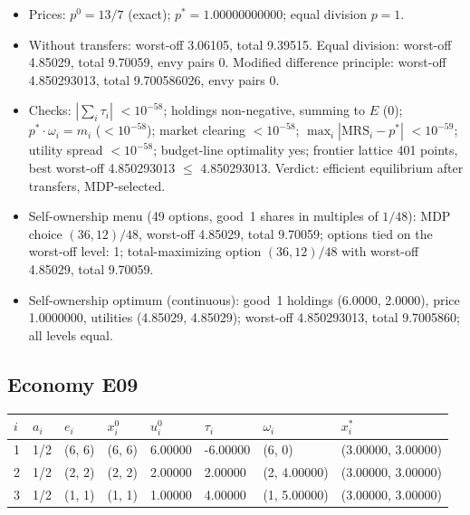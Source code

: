 \begin{itemize}[leftmargin=1.2em,itemsep=0pt,topsep=2pt]\footnotesize
\item Prices: $p^0 = 13/7$ (exact); $p^* = 1.00000000000$; equal division $p = 1$.
\item Without transfers: worst-off 3.06105, total 9.39515. Equal division: worst-off 4.85029, total 9.70059, envy pairs 0. Modified difference principle: worst-off 4.850293013, total 9.700586026, envy pairs 0.
\item Checks: $|\sum_i\tau_i|$ $<10^{-58}$; holdings non-negative, summing to $E$ (0); $p^*\cdot\omega_i = m_i$ ($<10^{-58}$); market clearing $<10^{-58}$; $\max_i|\mathrm{MRS}_i - p^*|$ $<10^{-59}$; utility spread $<10^{-58}$; budget-line optimality yes; frontier lattice 401 points, best worst-off 4.850293013 $\leq$ 4.850293013. Verdict: efficient equilibrium after transfers, MDP-selected.
\item Self-ownership menu (49 options, good~1 shares in multiples of $1/48$): MDP choice $(36, 12)/48$, worst-off 4.85029, total 9.70059; options tied on the worst-off level: 1; total-maximizing option $(36, 12)/48$ with worst-off 4.85029, total 9.70059.
\item Self-ownership optimum (continuous): good~1 holdings (6.0000, 2.0000), price 1.0000000, utilities (4.85029, 4.85029); worst-off 4.850293013, total 9.7005860; all levels equal.
\end{itemize}

\subsection*{Economy E09}
\label{ec:E09}
{\scriptsize\setlength{\tabcolsep}{3pt}
\begin{tabular}{@{}llllllll@{}}
\toprule
$i$ & $a_i$ & $e_i$ & $x^0_i$ & $u^0_i$ & $\tau_i$ & $\omega_i$ & $x^*_i$ \\
\midrule
1 & 1/2 & (6, 6) & (6, 6) & 6.00000 & -6.00000 & (6, 0) & (3.00000, 3.00000) \\
2 & 1/2 & (2, 2) & (2, 2) & 2.00000 & 2.00000 & (2, 4.00000) & (3.00000, 3.00000) \\
3 & 1/2 & (1, 1) & (1, 1) & 1.00000 & 4.00000 & (1, 5.00000) & (3.00000, 3.00000) \\
\bottomrule\end{tabular}}

